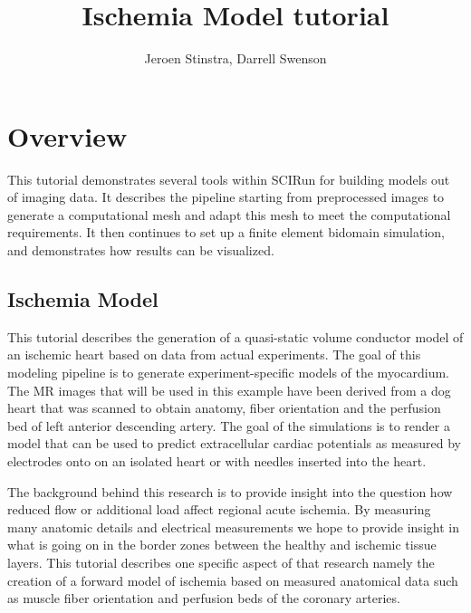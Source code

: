 \documentclass[fleqn,11pt,openany]{book}
\title{Ischemia Model tutorial}
\author{Jeroen Stinstra, Darrell Swenson}
\begin{document}


\maketitle


\chapter{Overview}

\begin{introduction}

This tutorial demonstrates several tools within SCIRun for building models out of imaging data. 
It describes the pipeline starting from preprocessed images to generate a computational mesh and adapt this mesh to meet the computational requirements.
It then continues to set up a finite element bidomain simulation,  and demonstrates how results can be visualized.   

\end{introduction}

\section{Ischemia Model}

This tutorial describes the generation of a quasi-static volume conductor model of an ischemic heart based on data from actual experiments.
The goal of this modeling pipeline is to generate experiment-specific models of the myocardium.
The MR images that will be used in this example have been derived from a dog heart that was scanned to obtain anatomy, fiber orientation and the perfusion bed of left anterior descending artery.
The goal of the simulations is to render a model that can be used to predict extracellular cardiac potentials as measured by electrodes onto on an isolated heart or with needles inserted into the heart. 

The background behind this research is to provide insight into the question how reduced flow or additional load affect regional acute ischemia. By measuring many anatomic details and electrical measurements we hope to provide insight in what is going on in the border zones between the healthy and ischemic tissue layers. This tutorial describes one specific aspect of that research namely the creation of a forward model of ischemia based on measured anatomical data such as muscle fiber orientation and perfusion beds of the coronary arteries.
\end{document}
